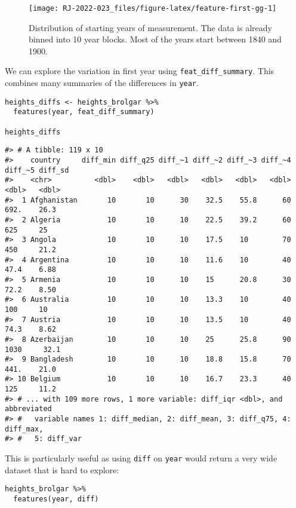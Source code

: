 \begin{figure}

{\centering \texttt{[image: RJ-2022-023\_files/figure-latex/feature-first-gg-1]} 

}

\caption{Distribution of starting years of measurement. The data is already binned into 10 year blocks. Most of the years start between 1840 and 1900.}\label{fig:feature-first-gg}
\end{figure}

We can explore the variation in first year using \texttt{feat\_diff\_summary}. This combines many summaries of the differences in \texttt{year}.

\begin{verbatim}
heights_diffs <- heights_brolgar %>% 
  features(year, feat_diff_summary)

heights_diffs
\end{verbatim}

\begin{verbatim}
#> # A tibble: 119 x 10
#>    country     diff_min diff_q25 diff_~1 diff_~2 diff_~3 diff_~4 diff_~5 diff_sd
#>    <chr>          <dbl>    <dbl>   <dbl>   <dbl>   <dbl>   <dbl>   <dbl>   <dbl>
#>  1 Afghanistan       10       10      30    32.5    55.8      60   692.    26.3 
#>  2 Algeria           10       10      10    22.5    39.2      60   625     25   
#>  3 Angola            10       10      10    17.5    10        70   450     21.2 
#>  4 Argentina         10       10      10    11.6    10        40    47.4    6.88
#>  5 Armenia           10       10      10    15      20.8      30    72.2    8.50
#>  6 Australia         10       10      10    13.3    10        40   100     10   
#>  7 Austria           10       10      10    13.5    10        40    74.3    8.62
#>  8 Azerbaijan        10       10      10    25      25.8      90  1030     32.1 
#>  9 Bangladesh        10       10      10    18.8    15.8      70   441.    21.0 
#> 10 Belgium           10       10      10    16.7    23.3      40   125     11.2 
#> # ... with 109 more rows, 1 more variable: diff_iqr <dbl>, and abbreviated
#> #   variable names 1: diff_median, 2: diff_mean, 3: diff_q75, 4: diff_max,
#> #   5: diff_var
\end{verbatim}

This is particularly useful as using \texttt{diff} on \texttt{year} would return a very wide dataset that is hard to explore:

\begin{verbatim}
heights_brolgar %>% 
  features(year, diff)
\end{verbatim}

